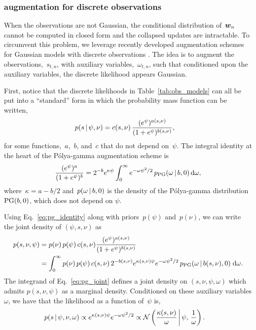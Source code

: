 \subsubsection{\polyagamma augmentation for discrete observations}
When the observations are not Gaussian, the conditional distribution
of~$\boldsymbol{w}_n$ cannot be computed in closed form and the collapsed
updates are intractable. To circumvent this problem, we leverage
recently developed augmentation schemes for Gaussian models with
discrete observations \cite{polson2013bayesian, Pillow2012}. The
idea is to augment the observations,~$s_{t,n}$, with auxiliary
variables,~$\omega_{t,n}$, such that conditioned upon the
auxiliary variables, the discrete likelihood appears Gaussian.

First, notice that the discrete likelihoods in Table~\ref{tab:obs_models}
can all be put into  a ``standard'' form in which the probability
mass function can be written,
\begin{align}
  p(s \,|\, \psi, \nu) &= c(s, \nu) \, \frac{(e^\psi)^{a(s, \nu)}}{(1+e^\psi)^{b(s, \nu)}},
\end{align}
for some functions,~$a$,~$b$, and~$c$ that do not depend on~$\psi$.
The integral identity at the heart of the P\'{o}lya-gamma augmentation scheme  is
\begin{align}
\label{eq:pg_identity}
\frac{(e^{\psi})^a}{(1+e^{\psi})^b} = 2^{-b} e^{\kappa \psi} \int_{0}^{\infty} e^{-\omega \psi^2 /2} \, p_{\mathrm{PG}}(\omega \,|\, b, 0) \, \mathrm{d}\omega,
\end{align}
where~${\kappa=a-b/2}$ and~$p(\omega\,|\, b, 0)$ is the density of the P\'{o}lya-gamma
distribution~${\mathrm{PG}(b, 0)}$, which does not depend on $\psi$.

Using Eq.~\ref{eq:pg_identity} along with priors~$p(\psi)$ and~$p(\nu)$, we can write the joint density of $(\psi, s, \nu)$ as
\begin{align}
  \label{eq:pg_joint}
  p(s, \nu, \psi)
  &= p(\nu) \, p(\psi) \, c(s, \nu) \frac{(e^\psi)^{a(s, \nu)}}{(1+e^\psi)^{b(s, \nu)}} \\
  &= \int_0^\infty
  p(\nu) \, p(\psi) \, c(s, \nu) \, 2^{-b(s, \nu)} e^{\kappa(s, \nu) \psi} e^{-\omega \psi^2/2} \, p_{\mathrm{PG}}(\omega \,|\, b(s, \nu), 0) \; \mathrm{d}\omega.
\end{align}
The integrand of Eq.~\ref{eq:pg_joint} defines a joint density on $(s, \nu, \psi, \omega)$ which admits $p(s, \nu, \psi)$ as a marginal density.
Conditioned on these auxiliary variables $\omega$, we have that the likelihood as a function of~$\psi$ is,
\begin{align}
  p(s \,|\, \psi, \nu, \omega)
  &\propto e^{\kappa(s, \nu) \psi} e^{- \omega \psi^2/2} 
\propto \mathcal{N} \left(\frac{\kappa(s, \nu)}{\omega} \, \bigg| \, \psi, \, \frac{1}{\omega} \right).
\end{align}

